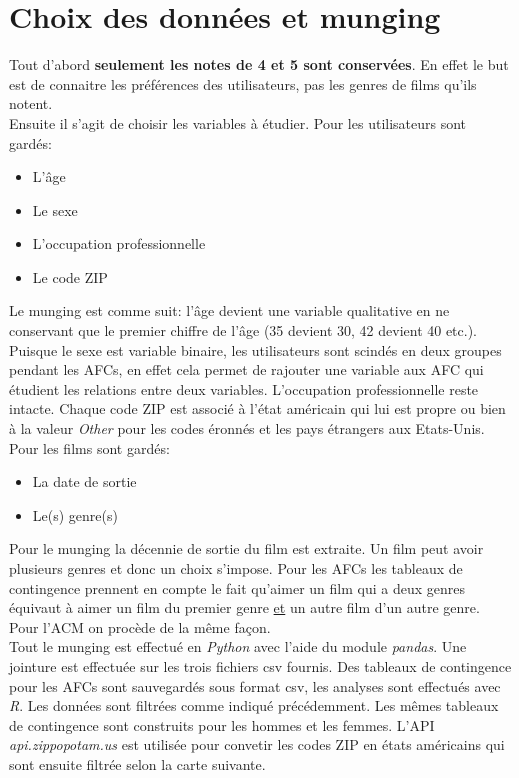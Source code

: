 \chapter{Choix des données et munging}

Tout d'abord \textbf{seulement les notes de 4 et 5 sont conservées}. En effet le but est de connaitre les préférences des utilisateurs, pas les genres de films qu'ils notent.
\bigskip
\\Ensuite il s'agit de choisir les variables à étudier. Pour les utilisateurs sont gardés:
\begin{itemize}
  \item L'âge
  \item Le sexe
  \item L'occupation professionnelle
  \item Le code ZIP
\end{itemize}
Le munging est comme suit: l'âge devient une variable qualitative en ne conservant que le premier chiffre de l'âge (35 devient 30, 42 devient 40 etc.). Puisque le sexe est variable binaire, les utilisateurs sont scindés en deux groupes pendant les AFCs, en effet cela permet de rajouter une variable aux AFC qui étudient les relations entre deux variables. L'occupation professionnelle reste intacte. Chaque code ZIP est associé à l'état américain qui lui est propre ou bien à la valeur \emph{Other} pour les codes éronnés et les pays étrangers aux Etats-Unis.
\bigskip
\\Pour les films sont gardés:
\begin{itemize}
  \item La date de sortie
  \item Le(s) genre(s)
\end{itemize}
Pour le munging la décennie de sortie du film est extraite. Un film peut avoir plusieurs genres et donc un choix s'impose. Pour les AFCs les tableaux de contingence prennent en compte le fait qu'aimer un film qui a deux genres équivaut à aimer un film du premier genre \underline{et} un autre film d'un autre genre. Pour l'ACM on procède de la même façon.
\bigskip
\\Tout le munging est effectué en \emph{Python} avec l'aide du module \emph{pandas}. Une jointure est effectuée sur les trois fichiers csv fournis. Des tableaux de contingence pour les AFCs sont sauvegardés sous format csv, les analyses sont effectués avec \emph{R}. Les données sont filtrées comme indiqué précédemment. Les mêmes tableaux de contingence sont construits pour les hommes et les femmes. L'API \emph{api.zippopotam.us} est utilisée pour convetir les codes ZIP en états américains qui sont ensuite filtrée selon la carte suivante.
